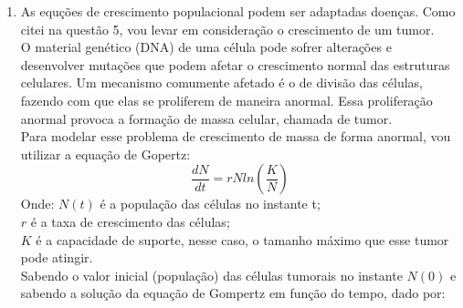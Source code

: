 \documentclass[a4paper]{article}
\begin{document}
\begin{enumerate}
\\
A grande maioria dos exemplos dado em sala, foram relacionados a dinâmica populacional com ou sem competi\c{c}\~ao e decaimento de poluentes, mostrando como isso afeta popula\c{c}\~oes. Mas, exemplos com doen\c{c}as foram abordados s\'o no final do curso, isso tamb\'em daria mais dinamismo a aula.
\\
\item
As equ\c{c}\~oes de crescimento populacional podem ser adaptadas doen\c{c}as. Como citei na quest\~ao 5, vou levar em considera\c{c}\~ao o crescimento de um tumor.
\\
O material gen\'etico (DNA) de uma c\'elula pode sofrer altera\c{c}\~oes e desenvolver muta\c{c}\~oes que podem afetar o crescimento normal das estruturas celulares. Um mecanismo comumente afetado \'e o de divis\~ao das c\'elulas, fazendo com que elas se proliferem de maneira anormal. Essa prolifera\c{c}\~ao anormal provoca a forma\c{c}\~ao de massa celular, chamada de tumor.
\\
Para modelar esse problema de crescimento de massa de forma anormal, vou utilizar a equa\c{c}\~ao de Gopertz:
\\
\begin{equation}
\frac{dN}{dt} = r N ln (\frac{K}{N})
\end{equation}
Onde:
$N(t)$ \'e a popula\c{c}\~ao das c\'elulas no instante t;
\\
$r$ \'e a taxa de crescimento das c\'elulas;
\\
$K$ \'e a capacidade de suporte, nesse caso, o tamanho m\'aximo que esse tumor pode atingir.
\\
Sabendo o valor inicial (popula\c{c}\~ao) das c\'elulas tumorais no instante $N(0)$ e sabendo a solu\c{c}\~ao da equa\c{c}\~ao de Gompertz em fun\c{c}\~ao do tempo, dado por:
\\

\end{enumerate}
\end{document}
